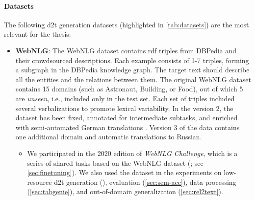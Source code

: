 {\paragraph{Datasets} The following \ac{d2t} generation datasets (highlighted in \autoref{tab:datasets}) are the most relevant for the thesis:


\begin{itemize}
    \item \textbf{WebNLG}: The WebNLG dataset \cite{gardentCreatingTrainingCorpora2017,gardentWebNLGChallengeGenerating2017} contains \ac{rdf} triples from DBPedia \cite{auer2007dbpedia} and their crowdsourced descriptions. Each example consists of 1-7 triples, forming a subgraph in the DBPedia knowledge graph. The target text should describe all the entities and the relations between them. The original WebNLG dataset \cite{gardentCreatingTrainingCorpora2017} contains 15 domains (such as Astronaut, Building, or Food), out of which 5 are \emph{unseen}, i.e., included only in the test set. Each set of triples included several verbalizations to promote lexical variability. In the version 2, the dataset has been fixed, annotated for intermediate subtasks, and enriched with semi-automated German translations \cite{shimorinaHandlingRareItems2018,castroferreiraEnrichingWebNLGCorpus2018}. Version 3 of the data \cite{ferreira20202020} contains one additional domain and automatic translations to Russian.
          \begin{itemize}
              \item
                    We participated in the 2020 edition of \emph{WebNLG Challenge}, which is a series of shared tasks based on the WebNLG dataset (\citealp{gardentWebNLGChallengeGenerating2017,shimorinaWebNLGChallengeHuman2019,ferreira20202020,cripwell2023WebNLGShared2023}; see \autoref{sec:finetuning}). We also used the dataset in the experiments on low-resource \ac{d2t} generation (), evaluation (\autoref{sec:sem-acc}), data processing (\autoref{sec:tabgenie}), and out-of-domain generalization (\autoref{sec:rel2text}).
          \end{itemize}


\end{itemize}}
